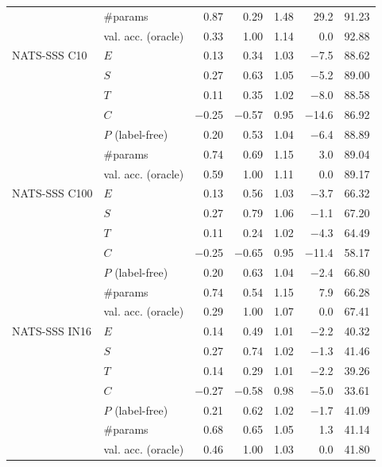 \begin{tabular}{@{}llrrrrr@{}}
 & \#params & 0.87 & 0.29 & 1.48 & 29.2 & 91.23\\
 & val. acc. (oracle) & 0.33 & 1.00 & 1.14 & 0.0 & 92.88\\
\midrule
NATS-SSS C10 & $E$ & 0.13 & 0.34 & 1.03 & $-$7.5 & 88.62\\
 & $S$ & 0.27 & 0.63 & 1.05 & $-$5.2 & 89.00\\
 & $T$ & 0.11 & 0.35 & 1.02 & $-$8.0 & 88.58\\
 & $C$ & $-$0.25 & $-$0.57 & 0.95 & $-$14.6 & 86.92\\
 & $P$ (label-free) & 0.20 & 0.53 & 1.04 & $-$6.4 & 88.89\\
 & \#params & 0.74 & 0.69 & 1.15 & 3.0 & 89.04\\
 & val. acc. (oracle) & 0.59 & 1.00 & 1.11 & 0.0 & 89.17\\
\midrule
NATS-SSS C100 & $E$ & 0.13 & 0.56 & 1.03 & $-$3.7 & 66.32\\
 & $S$ & 0.27 & 0.79 & 1.06 & $-$1.1 & 67.20\\
 & $T$ & 0.11 & 0.24 & 1.02 & $-$4.3 & 64.49\\
 & $C$ & $-$0.25 & $-$0.65 & 0.95 & $-$11.4 & 58.17\\
 & $P$ (label-free) & 0.20 & 0.63 & 1.04 & $-$2.4 & 66.80\\
 & \#params & 0.74 & 0.54 & 1.15 & 7.9 & 66.28\\
 & val. acc. (oracle) & 0.29 & 1.00 & 1.07 & 0.0 & 67.41\\
\midrule
NATS-SSS IN16 & $E$ & 0.14 & 0.49 & 1.01 & $-$2.2 & 40.32\\
 & $S$ & 0.27 & 0.74 & 1.02 & $-$1.3 & 41.46\\
 & $T$ & 0.14 & 0.29 & 1.01 & $-$2.2 & 39.26\\
 & $C$ & $-$0.27 & $-$0.58 & 0.98 & $-$5.0 & 33.61\\
 & $P$ (label-free) & 0.21 & 0.62 & 1.02 & $-$1.7 & 41.09\\
 & \#params & 0.68 & 0.65 & 1.05 & 1.3 & 41.14\\
 & val. acc. (oracle) & 0.46 & 1.00 & 1.03 & 0.0 & 41.80\\
\bottomrule
\end{tabular}
